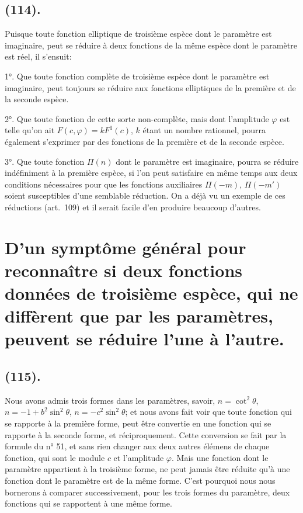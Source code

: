 \documentclass{article}
\begin{document}
\subsection*{(114).}

Puisque toute fonction elliptique de troisième espèce dont le paramètre est imaginaire, peut se réduire à deux fonctions de la même espèce dont le paramètre est réel, il s'ensuit:

1°. Que toute fonction complète de troisième espèce dont le paramètre est imaginaire, peut toujours se réduire aux fonctions elliptiques de la première et de la seconde espèce.

2°. Que toute fonction de cette sorte non-complète, mais dont l'amplitude $\varphi$ est telle qu'on ait $F(c,\varphi)=kF^{1}(c)$, $k$ étant un nombre rationnel, pourra également s'exprimer par des fonctions de la première et de la seconde espèce.


3°. Que toute fonction $\Pi(n)$ dont le paramètre est imaginaire, pourra se réduire indéfiniment à la première espèce, si l'on peut satisfaire en même temps aux deux conditions nécessaires pour que les fonctions auxiliaires $\Pi(-m)$, $\Pi(-m')$ soient susceptibles d'une semblable réduction. On a déjà vu un exemple de ces réductions (art.\ 109) et il serait facile d'en produire beaucoup d'autres.

\section*{D'un symptôme général pour reconnaître si deux fonctions données de troisième espèce, qui ne diffèrent que par les paramètres, peuvent se réduire l'une à l'autre.}

\subsection*{(115).}

Nous avons admis trois formes dans les paramètres, savoir, $n=\cot^{2}\theta$, $n=-1+b^{2}\sin^{2}\theta$, $n=-c^{2}\sin^{2}\theta$; et nous avons fait voir que toute fonction qui se rapporte à la première forme, peut être convertie en une fonction qui se rapporte à la seconde forme, et réciproquement. Cette conversion se fait par la formule du n° 51, et sans rien changer aux deux autres élémens de chaque fonction, qui sont le module $c$ et l'amplitude $\varphi$. Mais une fonction dont le paramètre appartient à la troisième forme, ne peut jamais être réduite qu'à une fonction dont le paramètre est de la même forme. C'est pourquoi nous nous bornerons à comparer successivement, pour les trois formes du paramètre, deux fonctions qui se rapportent à une même forme.
\end{document}
